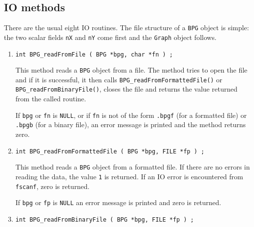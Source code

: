 \subsection{IO methods}
\label{subsection:BPG:proto:IO}
\par
There are the usual eight IO routines.
The file structure of a {\tt BPG} object is simple:
the two scalar fields {\tt nX} and {\tt nY}
come first and the {\tt Graph} object follows.
\par
\begin{enumerate}
\item
\begin{verbatim}
int BPG_readFromFile ( BPG *bpg, char *fn ) ;
\end{verbatim}
\par
This method reads a {\tt BPG} object from a file.
The method tries to open the file and if it is successful, 
it then calls {\tt BPG\_readFromFormattedFile()} or
{\tt BPG\_readFromBinaryFile()}, 
closes the file
and returns the value returned from the called routine.
\par {}
If {\tt bpg} or {\tt fn} is {\tt NULL}, 
or if {\tt fn} is not of the form
{\tt *.bpgf} (for a formatted file) 
or {\tt *.bpgb} (for a binary file),
an error message is printed and the method returns zero.
\item
\begin{verbatim}
int BPG_readFromFormattedFile ( BPG *bpg, FILE *fp ) ;
\end{verbatim}
\par
This method reads a {\tt BPG} object from a formatted file.
If there are no errors in reading the data, 
the value {\tt 1} is returned.
If an IO error is encountered from {\tt fscanf}, zero is returned.
\par {}
If {\tt bpg} or {\tt fp} is {\tt NULL} 
an error message is printed and zero is returned.
\item
\begin{verbatim}
int BPG_readFromBinaryFile ( BPG *bpg, FILE *fp ) ;
\end{verbatim}

\end{enumerate}
